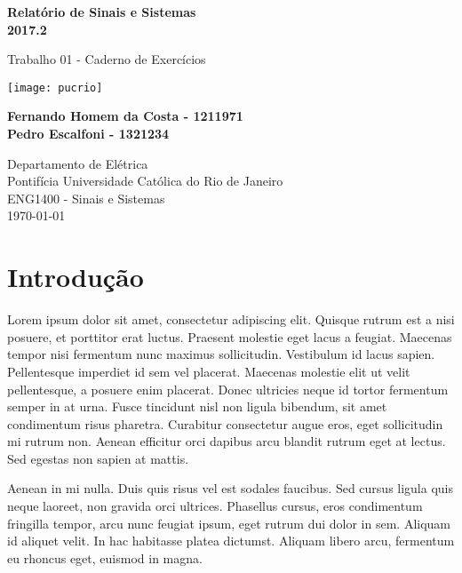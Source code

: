\documentclass[12pt, a4paper]{article}
\begin{document}
\begin{titlepage}
	\begin{center}
		\vspace*{1cm}

		\Huge
		\textbf{Relatório de Sinais e Sistemas}\\
		\Large
		\textbf{2017.2}

		\vspace{0.5cm}
		\Large
		Trabalho 01 - Caderno de Exercícios

		\vspace{1.5cm}

		\texttt{[image: pucrio]}

		\vspace{1.5cm}

		\normalsize
		\textbf{Fernando Homem da Costa - 1211971}\\
		\textbf{Pedro Escalfoni - 1321234}

		\vfill

		\Large
		Departamento de Elétrica\\
		Pontifícia Universidade Católica do Rio de Janeiro\\
		ENG1400 - Sinais e Sistemas\\
		\today

	\end{center}
\end{titlepage}

\tableofcontents

\newpage

\section{Introdução}
Lorem ipsum dolor sit amet, consectetur adipiscing elit. Quisque rutrum est a nisi posuere, et porttitor erat luctus. Praesent molestie eget lacus a feugiat. Maecenas tempor nisi fermentum nunc maximus sollicitudin. Vestibulum id lacus sapien. Pellentesque imperdiet id sem vel placerat. Maecenas molestie elit ut velit pellentesque, a posuere enim placerat. Donec ultricies neque id tortor fermentum semper in at urna. Fusce tincidunt nisl non ligula bibendum, sit amet condimentum risus pharetra. Curabitur consectetur augue eros, eget sollicitudin mi rutrum non. Aenean efficitur orci dapibus arcu blandit rutrum eget at lectus. Sed egestas non sapien at mattis.

Aenean in mi nulla. Duis quis risus vel est sodales faucibus. Sed cursus ligula quis neque laoreet, non gravida orci ultrices. Phasellus cursus, eros condimentum fringilla tempor, arcu nunc feugiat ipsum, eget rutrum dui dolor in sem. Aliquam id aliquet velit. In hac habitasse platea dictumst. Aliquam libero arcu, fermentum eu rhoncus eget, euismod in magna.
\end{document}

